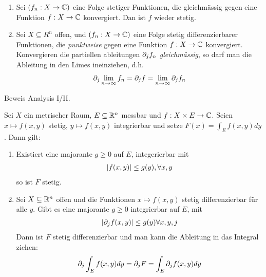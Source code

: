 \begin{satz}[]
	\begin{enumerate}
		\item Sei $(f_n: X \to \mathbb{C})$ eine Folge stetiger Funktionen, die gleichmässig gegen eine Funktion $f: X \to \mathbb{C}$ konvergiert. Dan ist $f$ wieder stetig.
		\item Sei $X \subseteq R^{n}$ offen, und $(f_n: X \to \mathbb{C})$ eine Folge stetig differenzierbarer Funktionen, die \emph{punktweise} gegen eine Funktion $f: X \to \mathbb{C}$ konvergiert. Konvergieren die partiellen ableitungen $\partial_j f_n$ \emph{gleichmässig}, so darf man die Ableitung in den Limes ineinziehen, d.h.
		\begin{align*}
			\partial_j \lim_{n \to \infty} f_n = \partial_j f = \lim_{n \to \infty} \partial_j f_n
		\end{align*}
	\end{enumerate}
\end{satz}
Beweis Analysis I/II.

\begin{satz}[]
	Sei $X$ ein metrischer Raum, $E \subseteq \mathbb{R}^n$ messbar und $f: X \times E \to \mathbb{C}$. Seien $x \mapsto f(x,y)$ stetig, $y \mapsto f(x,y)$ integrierbar und setze $F(x) = \int_E f(x,y) dy$. Dann gilt:
	\begin{enumerate}
	\item 	Existiert eine majorante $g \geq 0$ auf $E$, integerierbar mit 
		\begin{align*}
			\vert f(x,y)\vert \leq g(y), \forall x,y
		\end{align*}
		so ist $F$ stetig.
	\item Sei $X \subseteq \mathbb{R}^n$ offen und die Funktionen $x \mapsto f(x,y)$ stetig differenzierbar für alle $y$. Gibt es eine majorante $g \geq 0$ integrierbar auf $E$, mit
		\begin{align*}
			\vert\partial_j f(x,y)\vert \leq g(y) \forall x, y, j
		\end{align*}
		Dann ist $F$ stetig differenzierbar und man kann die Ableitung in das Integral ziehen:
		\begin{align*}
			\partial_j \int_{E} f(x,y) dy = \partial_j F = \int_{E} \partial_j f(x,y) dy
		\end{align*}
	\end{enumerate}
\end{satz}

